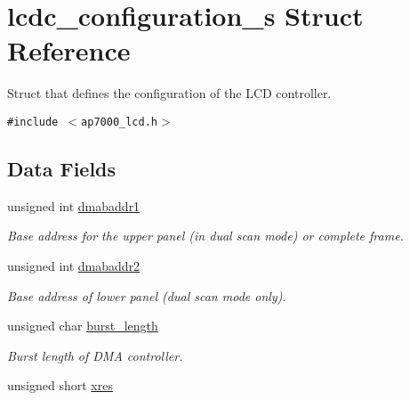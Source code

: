 \hypertarget{structlcdc__configuration__s}{
\section{lcdc\_\-configuration\_\-s Struct Reference}
\label{structlcdc__configuration__s}
}
Struct that defines the configuration of the LCD controller.  


{\tt \#include $<$ap7000\_\-lcd.h$>$}

\subsection*{Data Fields}
\begin{CompactItemize}
\item 
\hypertarget{structlcdc__configuration__s_5c7a9f39f360e5ea9b82acfc91917060}{
unsigned int \hyperlink{structlcdc__configuration__s_5c7a9f39f360e5ea9b82acfc91917060}{dmabaddr1}}
\label{structlcdc__configuration__s_5c7a9f39f360e5ea9b82acfc91917060}

\begin{CompactList}\small\item\em Base address for the upper panel (in dual scan mode) or complete frame. \item\end{CompactList}\item 
\hypertarget{structlcdc__configuration__s_760c0453ffd1f4112d5a540a24b3da72}{
unsigned int \hyperlink{structlcdc__configuration__s_760c0453ffd1f4112d5a540a24b3da72}{dmabaddr2}}
\label{structlcdc__configuration__s_760c0453ffd1f4112d5a540a24b3da72}

\begin{CompactList}\small\item\em Base address of lower panel (dual scan mode only). \item\end{CompactList}\item 
\hypertarget{structlcdc__configuration__s_c48b98efba736f156ef780945cfa11ea}{
unsigned char \hyperlink{structlcdc__configuration__s_c48b98efba736f156ef780945cfa11ea}{burst\_\-length}}
\label{structlcdc__configuration__s_c48b98efba736f156ef780945cfa11ea}

\begin{CompactList}\small\item\em Burst length of DMA controller. \item\end{CompactList}\item 
\hypertarget{structlcdc__configuration__s_5e7f931337fd8b529ee90f4260b36097}{
unsigned short \hyperlink{structlcdc__configuration__s_5e7f931337fd8b529ee90f4260b36097}{xres}}
\label{structlcdc__configuration__s_5e7f931337fd8b529ee90f4260b36097}


\end{CompactItemize}
